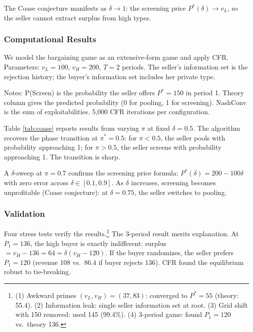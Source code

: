 The Coase conjecture manifests as $\delta \to 1$: the screening price $P^*(\delta) \to v_L$, so the seller cannot extract surplus from high types.

\subsubsection{Computational Results}

We model the bargaining game as an extensive-form game and apply CFR. Parameters: $v_L = 100$, $v_H = 200$, $T = 2$ periods. The seller's information set is the rejection history; the buyer's information set includes her private type.

\begin{table}[htbp]
\centering
\caption{CFR Equilibrium vs. Theory: $\pi$-sweep at $\delta = 0.5$}
\label{tab:coase}

\begin{minipage}{0.9\textwidth}
\footnotesize
Notes: P(Screen) is the probability the seller offers $P^* = 150$ in period 1. Theory column gives the predicted probability (0 for pooling, 1 for screening). NashConv is the sum of exploitabilities. 5,000 CFR iterations per configuration.
\end{minipage}
\end{table}

Table \ref{tab:coase} reports results from varying $\pi$ at fixed $\delta = 0.5$. The algorithm recovers the phase transition at $\pi^* = 0.5$: for $\pi < 0.5$, the seller pools with probability approaching 1; for $\pi > 0.5$, the seller screens with probability approaching 1. The transition is sharp.

A $\delta$-sweep at $\pi = 0.7$ confirms the screening price formula: $P^*(\delta) = 200 - 100\delta$ with zero error across $\delta \in [0.1, 0.9]$. As $\delta$ increases, screening becomes unprofitable (Coase conjecture): at $\delta = 0.75$, the seller switches to pooling.

\subsubsection{Validation}

Four stress tests verify the results.\footnote{(1) Awkward primes $(v_L, v_H) = (37, 83)$: converged to $P^* = 55$ (theory: 55.4). (2) Information leak: single seller information set at root. (3) Grid shift with 150 removed: used 145 (99.4\%). (4) 3-period game: found $P_1 = 120$ vs.\ theory 136.} The 3-period result merits explanation. At $P_1 = 136$, the high buyer is exactly indifferent: surplus $= v_H - 136 = 64 = \delta(v_H - 120)$. If the buyer randomizes, the seller prefers $P_1 = 120$ (revenue 108 vs.\ 86.4 if buyer rejects 136). CFR found the equilibrium robust to tie-breaking.

